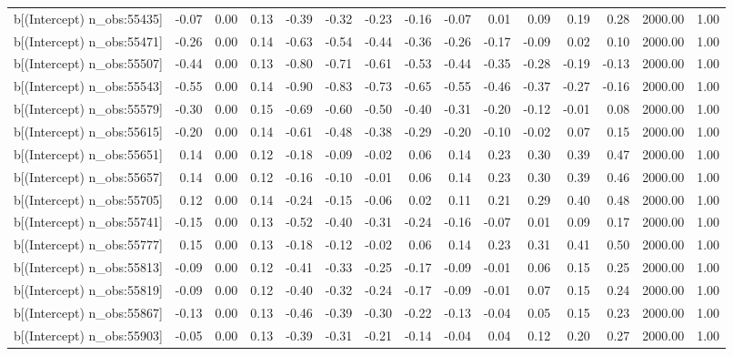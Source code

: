 \begin{table}[ht]
\begin{tabular}{rrrrrrrrrrrrrrr}
  b[(Intercept) n\_obs:55435] & -0.07 & 0.00 & 0.13 & -0.39 & -0.32 & -0.23 & -0.16 & -0.07 & 0.01 & 0.09 & 0.19 & 0.28 & 2000.00 & 1.00 \\ 
  b[(Intercept) n\_obs:55471] & -0.26 & 0.00 & 0.14 & -0.63 & -0.54 & -0.44 & -0.36 & -0.26 & -0.17 & -0.09 & 0.02 & 0.10 & 2000.00 & 1.00 \\ 
  b[(Intercept) n\_obs:55507] & -0.44 & 0.00 & 0.13 & -0.80 & -0.71 & -0.61 & -0.53 & -0.44 & -0.35 & -0.28 & -0.19 & -0.13 & 2000.00 & 1.00 \\ 
  b[(Intercept) n\_obs:55543] & -0.55 & 0.00 & 0.14 & -0.90 & -0.83 & -0.73 & -0.65 & -0.55 & -0.46 & -0.37 & -0.27 & -0.16 & 2000.00 & 1.00 \\ 
  b[(Intercept) n\_obs:55579] & -0.30 & 0.00 & 0.15 & -0.69 & -0.60 & -0.50 & -0.40 & -0.31 & -0.20 & -0.12 & -0.01 & 0.08 & 2000.00 & 1.00 \\ 
  b[(Intercept) n\_obs:55615] & -0.20 & 0.00 & 0.14 & -0.61 & -0.48 & -0.38 & -0.29 & -0.20 & -0.10 & -0.02 & 0.07 & 0.15 & 2000.00 & 1.00 \\ 
  b[(Intercept) n\_obs:55651] & 0.14 & 0.00 & 0.12 & -0.18 & -0.09 & -0.02 & 0.06 & 0.14 & 0.23 & 0.30 & 0.39 & 0.47 & 2000.00 & 1.00 \\ 
  b[(Intercept) n\_obs:55657] & 0.14 & 0.00 & 0.12 & -0.16 & -0.10 & -0.01 & 0.06 & 0.14 & 0.23 & 0.30 & 0.39 & 0.46 & 2000.00 & 1.00 \\ 
  b[(Intercept) n\_obs:55705] & 0.12 & 0.00 & 0.14 & -0.24 & -0.15 & -0.06 & 0.02 & 0.11 & 0.21 & 0.29 & 0.40 & 0.48 & 2000.00 & 1.00 \\ 
  b[(Intercept) n\_obs:55741] & -0.15 & 0.00 & 0.13 & -0.52 & -0.40 & -0.31 & -0.24 & -0.16 & -0.07 & 0.01 & 0.09 & 0.17 & 2000.00 & 1.00 \\ 
  b[(Intercept) n\_obs:55777] & 0.15 & 0.00 & 0.13 & -0.18 & -0.12 & -0.02 & 0.06 & 0.14 & 0.23 & 0.31 & 0.41 & 0.50 & 2000.00 & 1.00 \\ 
  b[(Intercept) n\_obs:55813] & -0.09 & 0.00 & 0.12 & -0.41 & -0.33 & -0.25 & -0.17 & -0.09 & -0.01 & 0.06 & 0.15 & 0.25 & 2000.00 & 1.00 \\ 
  b[(Intercept) n\_obs:55819] & -0.09 & 0.00 & 0.12 & -0.40 & -0.32 & -0.24 & -0.17 & -0.09 & -0.01 & 0.07 & 0.15 & 0.24 & 2000.00 & 1.00 \\ 
  b[(Intercept) n\_obs:55867] & -0.13 & 0.00 & 0.13 & -0.46 & -0.39 & -0.30 & -0.22 & -0.13 & -0.04 & 0.05 & 0.15 & 0.23 & 2000.00 & 1.00 \\ 
  b[(Intercept) n\_obs:55903] & -0.05 & 0.00 & 0.13 & -0.39 & -0.31 & -0.21 & -0.14 & -0.04 & 0.04 & 0.12 & 0.20 & 0.27 & 2000.00 & 1.00 \\ 

\end{tabular}
\end{table}
